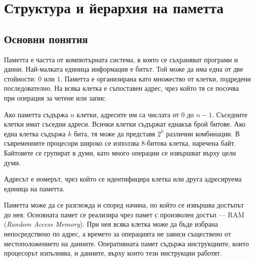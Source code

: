 \begin{konspekt}
\end{konspekt}

\section{Структура и йерархия на паметта}\label{s:10.1}

\subsection{Основни понятия}\label{s:10.1.1}

Паметта е частта от компютърната система, в която се съхраняват програми и данни. Най-малката единица информация е битът. Той може да има една от две стойности: $0$ или $1$. Паметта е организирана като множество от клетки, подредени последователно. На всяка клетка е съпоставен адрес, чрез който тя се посочва при операция за четене или запис.

Ако паметта съдържа $n$ клетки, адресите им са числата от $0$ до $n-1$. Съседните клетки имат съседни адреси. Всички клетки съдържат еднакъв брой битове. Ако една клетка съдържа $k$ бита, тя може да представя $2^k$ различни комбинации. В съвременните процесори широко се използва 8-битова клетка, наречена байт. Байтовете се групират в думи, като много операции се извършват върху цели думи.

\begin{defn}[Адрес]
Адресът е номерът, чрез който се идентифицира клетка или друга адресируема единица на паметта.
\end{defn}

Паметта може да се разглежда и според начина, по който се извършва достъпът до нея. Основната памет се реализира чрез памет с произволен достъп --- RAM (\emph{Random Access Memory}). При нея всяка клетка може да бъде избрана непосредствено по адрес, а времето за операцията не зависи съществено от местоположението на данните. Оперативната памет съдържа инструкциите, които процесорът изпълнява, и данните, върху които тези инструкции работят.


